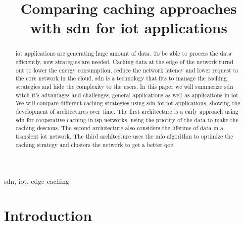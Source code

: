 \documentclass[conference]{IEEEtran}
\begin{document}
	\title{Comparing caching approaches with \ac{sdn} for \ac{iot} applications}


	\author{
		}

	\maketitle

	\begin{abstract}
	\ac{iot} applications are generating huge amount of data. To be able to process the data efficiently, new strategies are needed. Caching data at the edge of the network turnd out to lower the energy consumption, reduce the network latency and lower request to the core network in the cloud. \ac{sdn} is a technology that fits to manage the caching strategies and hide the complexity to the users. In this paper we will summerize \ac{sdn} witch it's advantages and challenges, general applications as well as applicaitons in \ac{iot}. We will compare different caching strategies using \ac{sdn} for \ac{iot} applications, showing the development of archtectures over time. The first architecture is a early approach using \ac{sdn} for cooperative caching in \ac{isp} networks, using the priority of the data to make the caching descions. The second architecture also considers the lifetime of data in a transient \ac{iot} network. The third architecture uses the \ac{mfo} algorithm to optimize the caching strategy and clusters the network to get a better \ac{qoe}.
	\end{abstract}

	\begin{IEEEkeywords}
	\ac{sdn}, \ac{iot}, edge caching
	\end{IEEEkeywords}

	\IEEEpeerreviewmaketitle

	\section{Introduction}
	\label{sec:introduction}
\end{document}
